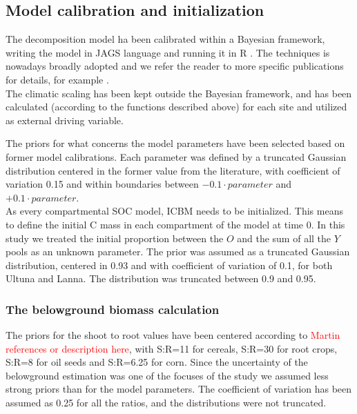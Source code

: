 \documentclass[review]{elsarticle}
\begin{document}
\subsection{Model calibration and initialization}
The decomposition model ha been calibrated within a Bayesian framework, writing the model in JAGS language \cite{JAGS} and running it in R \cite{R-Development-Core-Team2019}. The techniques is nowadays broadly adopted and we refer the reader to more specific publications for details, for example \cite{Kruschke2013, JAGS, AndrewGelman2004}.\\
The climatic scaling has been kept outside the Bayesian framework, and has been calculated (according to the functions described above) for each site and utilized as external driving variable.

The priors for what concerns the model parameters have been selected based on former model calibrations. Each parameter was defined by a truncated Gaussian distribution centered in the former value from the literature, with coefficient of variation 0.15 and  within boundaries between $-0.1\cdot parameter$ and $+0.1\cdot parameter$.\\

As every compartmental SOC model, ICBM needs to be initialized. This means to define the initial C mass in each compartment of the model at time 0. In this study we treated the initial proportion between the $O$ and the sum of all the $Y$ pools as an unknown parameter. The prior was assumed as a truncated Gaussian distribution, centered in 0.93 and with coefficient of variation of 0.1, for both Ultuna and Lanna. The distribution was truncated between 0.9 and 0.95.

\subsubsection{The belowground biomass calculation}
The priors for the shoot to root values have been centered according to \textcolor{red}{Martin references or description here}, with S:R=11 for cereals, S:R=30 for root crops, S:R=8 for oil seeds and S:R=6.25 for corn. Since the uncertainty of the belowground estimation was one of the focuses of the study we assumed less strong priors than for the model parameters. The coefficient of variation has been assumed as 0.25 for all the ratios, and the distributions were not truncated.
\end{document}
